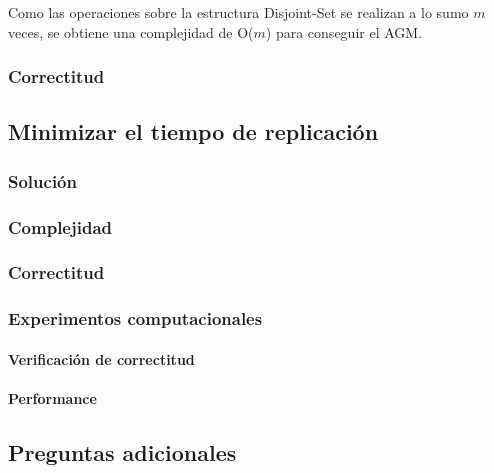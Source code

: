 \documentclass[a4paper, 10pt, twoside]{article}
\begin{document}
Como las operaciones sobre la estructura Disjoint-Set se realizan a lo sumo $m$ veces, se obtiene una complejidad de O($m$) para conseguir el AGM.

\subsubsection{Correctitud}

\subsection{Minimizar el tiempo de replicación}

\subsubsection{Solución}

\subsubsection{Complejidad}

\subsubsection{Correctitud}

\subsubsection{Experimentos computacionales}

\paragraph{Verificación de correctitud}

\paragraph{Performance}

\subsection{Preguntas adicionales}



\end{document}
